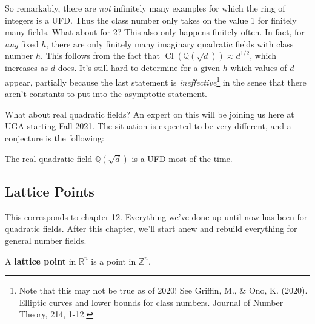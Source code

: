 \begin{remark}

So remarkably, there are \emph{not} infinitely many examples for which
the ring of integers is a UFD. Thus the class number only takes on the
value 1 for finitely many fields. What about for 2? This also only
happens finitely often. In fact, for \emph{any} fixed \(h\), there are
only finitely many imaginary quadratic fields with class number \(h\).
This follows from the fact that
\({ \operatorname{Cl}} ({\mathbb{Q}}( \sqrt{d} )) \approx d^{1/2}\),
which increases as \(d\) does. It's still hard to determine for a given
\(h\) which values of \(d\) appear, partially because the last statement
is \emph{ineffective}\footnote{Note that this may not be true as of
  2020! See Griffin, M., \& Ono, K. (2020). Elliptic curves and lower
  bounds for class numbers. Journal of Number Theory, 214, 1-12.} in the
sense that there aren't constants to put into the asymptotic statement.

\end{remark}

\begin{remark}

What about real quadratic fields? An expert on this will be joining us
here at UGA starting Fall 2021. The situation is expected to be very
different, and a conjecture is the following:

\end{remark}

\begin{conjecture}

The real quadratic field \({\mathbb{Q}}(\sqrt{d})\) is a UFD most of the
time.

\end{conjecture}

\hypertarget{lattice-points}{%
\subsection{Lattice Points}\label{lattice-points}}

\begin{remark}

This corresponds to chapter 12. Everything we've done up until now has
been for quadratic fields. After this chapter, we'll start anew and
rebuild everything for general number fields.

\end{remark}

\begin{definition}

A \textbf{lattice point} in \({\mathbb{R}}^n\) is a point in
\({\mathbb{Z}}^n\).

\end{definition}

